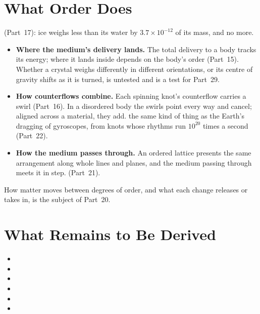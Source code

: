 \documentclass[11pt,a4paper]{article}
\begin{document}
\section{What Order Does}
\label{sec:order}

 (Part~17): ice weighs less than its water by $3.7\times10^{-12}$ of its mass, and no more. 
\begin{itemize}
\item \textbf{Where the medium's delivery lands.} The total delivery to a body tracks its energy; where it lands inside depends on the body's order (Part~15). Whether a crystal weighs differently in different orientations, or its centre of gravity shifts as it is turned, is untested and is a test for Part~29.
\item \textbf{How counterflows combine.} Each spinning knot's counterflow carries a swirl (Part~16). In a disordered body the swirls point every way and cancel; aligned across a material, they add.  the same kind of thing as the Earth's dragging of gyroscopes, from knots whose rhythms run $10^{20}$ times a second (Part~22).
\item \textbf{How the medium passes through.} An ordered lattice presents the same arrangement along whole lines and planes, and the medium passing through meets it in step.  (Part~21).
\end{itemize}
How matter moves between degrees of order, and what each change releases or takes in, is the subject of Part~20.


\section{What Remains to Be Derived}
\label{sec:owed}

\begin{itemize}
\item {}
\item {}
\item {}
\item {}
\item {}
\item {}
\end{itemize}
\end{document}
